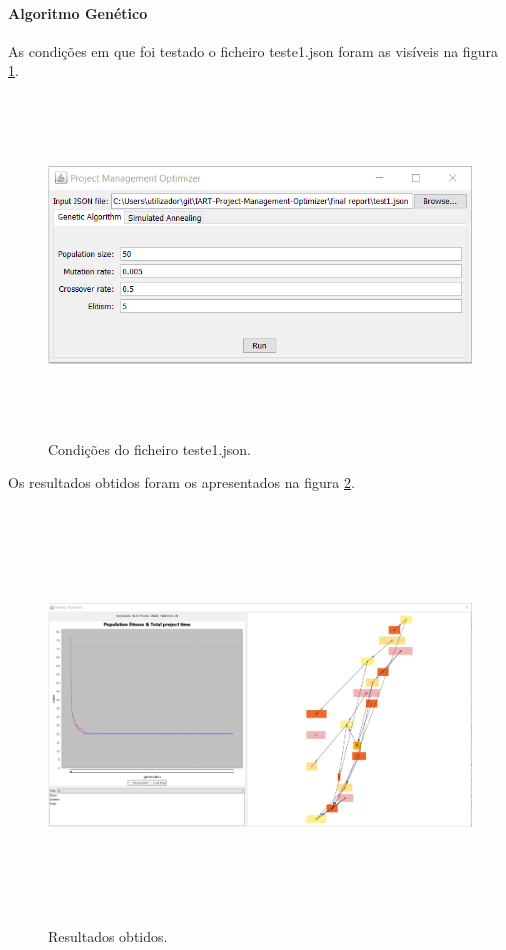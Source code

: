 \begin{titlepage}
\paragraph{Algoritmo Genético}

As condições em que foi testado o ficheiro teste1.json foram as visíveis na figura \ref{teste1}. 

\begin{figure}[H]
  \centering
    \includegraphics[width=14cm, height = 9cm]{test1.png}
  \caption{Condições do ficheiro teste1.json.}
  \label{teste1}
\end{figure}

Os resultados obtidos foram os apresentados na figura \ref{exp1}.

\begin{figure}[H]
  \centering
    \includegraphics[width=19cm, height = 11cm]{exp1.png}
  \caption{Resultados obtidos.}
  \label{exp1}
\end{figure}


\end{titlepage}
